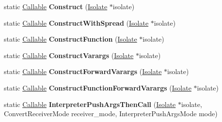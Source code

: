 \begin{DoxyCompactItemize}
static \mbox{\hyperlink{classv8_1_1internal_1_1Callable}{Callable}} {\bfseries Construct} (\mbox{\hyperlink{classv8_1_1internal_1_1Isolate}{Isolate}} $\ast$isolate)
\item 
\mbox{\label{classv8_1_1internal_1_1CodeFactory_a19a13b6ef1c39d2cf1e6cf87f3de4d65}} 
static \mbox{\hyperlink{classv8_1_1internal_1_1Callable}{Callable}} {\bfseries Construct\+With\+Spread} (\mbox{\hyperlink{classv8_1_1internal_1_1Isolate}{Isolate}} $\ast$isolate)
\item 
\mbox{\label{classv8_1_1internal_1_1CodeFactory_ae6f1885eebafba5f9756e42c5cbaec09}} 
static \mbox{\hyperlink{classv8_1_1internal_1_1Callable}{Callable}} {\bfseries Construct\+Function} (\mbox{\hyperlink{classv8_1_1internal_1_1Isolate}{Isolate}} $\ast$isolate)
\item 
\mbox{\label{classv8_1_1internal_1_1CodeFactory_a116caeddb685f597d819679d03622123}} 
static \mbox{\hyperlink{classv8_1_1internal_1_1Callable}{Callable}} {\bfseries Construct\+Varargs} (\mbox{\hyperlink{classv8_1_1internal_1_1Isolate}{Isolate}} $\ast$isolate)
\item 
\mbox{\label{classv8_1_1internal_1_1CodeFactory_aefecb4f2eebfb835f155691a7f3e8c6f}} 
static \mbox{\hyperlink{classv8_1_1internal_1_1Callable}{Callable}} {\bfseries Construct\+Forward\+Varargs} (\mbox{\hyperlink{classv8_1_1internal_1_1Isolate}{Isolate}} $\ast$isolate)
\item 
\mbox{\label{classv8_1_1internal_1_1CodeFactory_a11090233413209fb2cda77d14a6a844d}} 
static \mbox{\hyperlink{classv8_1_1internal_1_1Callable}{Callable}} {\bfseries Construct\+Function\+Forward\+Varargs} (\mbox{\hyperlink{classv8_1_1internal_1_1Isolate}{Isolate}} $\ast$isolate)
\item 
\mbox{\label{classv8_1_1internal_1_1CodeFactory_aa976564cd9ba4fd5d97bc95d8080a155}} 
static \mbox{\hyperlink{classv8_1_1internal_1_1Callable}{Callable}} {\bfseries Interpreter\+Push\+Args\+Then\+Call} (\mbox{\hyperlink{classv8_1_1internal_1_1Isolate}{Isolate}} $\ast$isolate, Convert\+Receiver\+Mode receiver\+\_\+mode, Interpreter\+Push\+Args\+Mode mode)

\end{DoxyCompactItemize}
